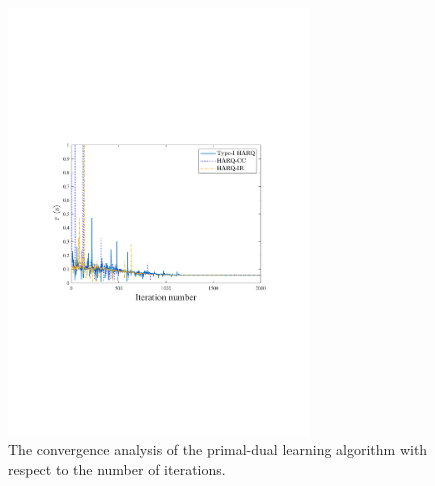 \documentclass[conference]{IEEEtran}
\begin{document}
\begin{figure}[htbp]
    \centering
    \includegraphics[width=8cm]{delay-itera7.pdf}
    \caption{The convergence analysis of the primal-dual learning algorithm with respect to the number of iterations.}
    \label{FIG7} %
\end{figure}





\end{document}
